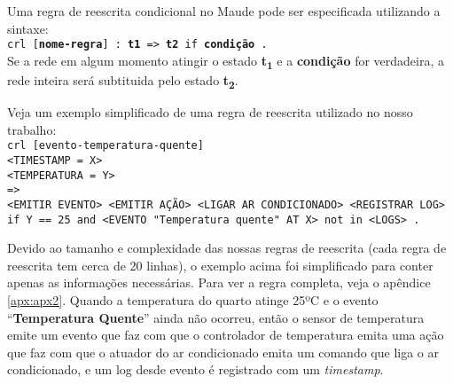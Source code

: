 \noindent
Uma regra de reescrita condicional no Maude pode ser especificada utilizando a sintaxe: \\
\texttt{crl [\textbf{nome-regra}] : \textbf{t1} => \textbf{t2} if \textbf{condição} . } \\
Se a rede em algum momento atingir o estado \textbf{t\textsubscript{1}} e a \textbf{condição} for verdadeira, a rede inteira será subtituida pelo estado \textbf{t\textsubscript{2}}.

Veja um exemplo simplificado de uma regra de reescrita utilizado no nosso trabalho: \\
\texttt{crl [evento-temperatura-quente]} \\
\texttt{<TIMESTAMP = X>} \\
\texttt{<TEMPERATURA = Y>} \\
\texttt{=>} \\
\texttt{<EMITIR EVENTO> <EMITIR AÇÃO> <LIGAR AR CONDICIONADO> <REGISTRAR LOG>} \\
\texttt{if Y == 25 and <EVENTO "Temperatura quente"\ AT X> not in <LOGS> .}

Devido ao tamanho e complexidade das nossas regras de reescrita (cada regra de reescrita tem cerca de 20 linhas), o exemplo acima foi simplificado para conter apenas as informações necessárias. Para ver a regra completa, veja o apêndice \ref{apx:apx2}. Quando a temperatura do quarto atinge 25ºC e o evento ``\textbf{Temperatura Quente}'' ainda não ocorreu, então o sensor de temperatura emite um evento que faz com que o controlador de temperatura emita uma ação que faz com que o atuador do ar condicionado emita um comando que liga o ar condicionado, e um log desde evento é registrado com um \textit{timestamp}.